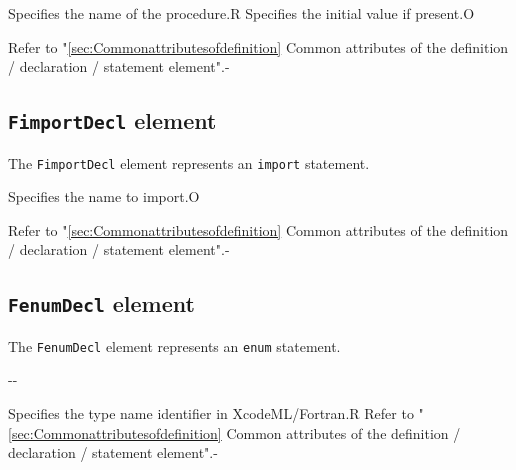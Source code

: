 \begin{XcodeMLChildElements}
{Specifies the name of the procedure.}{R}
{Specifies the initial value if present.}{O}
\end{XcodeMLChildElements}

\begin{XcodeMLAttributes}
{Refer to "\ref{sec:Commonattributesofdefinition} Common attributes of the definition / declaration / statement element".}{-}
\end{XcodeMLAttributes}


\subsection{ {\tt FimportDecl} element}

The {\tt FimportDecl} element represents an {\tt import} statement.


\begin{XcodeMLChildElements}
{Specifies the name to import.}{O}
\end{XcodeMLChildElements}

\begin{XcodeMLAttributes}
{Refer to "\ref{sec:Commonattributesofdefinition} Common attributes of the definition / declaration / statement element".}{-}
\end{XcodeMLAttributes}


\subsection{ {\tt FenumDecl} element}

The {\tt FenumDecl} element represents an {\tt enum} statement.


\begin{XcodeMLChildElements}
  \XcodeMLElementDef{-}
  {-}{-}
\end{XcodeMLChildElements}

\begin{XcodeMLAttributes}
{Specifies the type name identifier in XcodeML/Fortran.}{R}
{Refer to "\ref{sec:Commonattributesofdefinition} Common attributes of the definition / declaration / statement element".}{-}
\end{XcodeMLAttributes}
